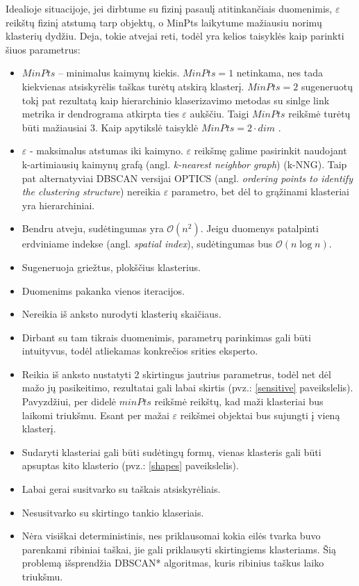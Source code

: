 \documentclass{VUMIFInfKursinis}
\newcommand{\ltang}[2]{#1 (angl. \textit{#2})}
\newcommand{\BigO}[1]{$\mathcal{O}(#1)$}
\begin{document}
Idealioje situacijoje, jei dirbtume su fizinį pasaulį atitinkančiais
duomenimis, $ε$ reikštų fizinį atstumą tarp objektų, o MinPts laikytume
mažiausiu norimų klasterių dydžiu. Deja, tokie atvejai reti, todėl yra
kelios taisyklės kaip parinkti šiuos parametrus:

\begin{itemize}
\item
  $MinPts$ – minimalus kaimynų kiekis. $MinPts = 1$
  netinkama, nes tada kiekvienas atsiskyrėlis taškas turėtų atskirą
  klasterį. $MinPts = 2$ sugeneruotų tokį pat rezultatą kaip
  hierarchinio klaserizavimo metodas su sinlge link metrika ir
  dendrograma atkirpta ties $ε$ aukščiu. Taigi $MinPts$ reikšmė
  turėtų būti mažiausiai $3$. Kaip apytikslė taisyklė $MinPts = 2 \cdot dim$
  \cite{sander1998density}.
\item
  $ε$ - maksimalus atstumas iki kaimyno. $ε$ reikšmę galime pasirinkit
  naudojant \ltang{k-artimiausių kaimynų grafą}{k-nearest neighbor graph}
  (k-NNG). Taip pat alternatyviai DBSCAN versijai \ltang{OPTICS}{ordering
  points to identify the clustering structure} nereikia $ε$
  parametro, bet dėl to grąžinami klasteriai yra hierarchiniai.
\end{itemize}

\begin{itemize}
\item
  Bendru atveju, sudėtingumas yra \BigO{n^2}. Jeigu duomenys patalpinti
  \ltang{erdviniame indekse}{spatial index}, sudėtingumas bus \BigO{n \log n}.
\item
  Sugeneruoja griežtus, plokščius klasterius.
\item
  Duomenims pakanka vienos iteracijos.
\item
  Nereikia iš anksto nurodyti klasterių skaičiaus.
\item
  Dirbant su tam tikrais duomenimis, parametrų parinkimas gali būti
  intuityvus, todėl atliekamas konkrečios srities eksperto.
\item
  Reikia iš anksto nustatyti 2 skirtingus jautrius parametrus, todėl net
  dėl mažo jų pasikeitimo, rezultatai gali labai skirtis (pvz.: \ref{sensitive} paveikslelis). Pavyzdžiui, per didelė $minPts$ reikšmė
  reikštų, kad maži klasteriai bus laikomi triukšmu. Esant per mažai $ε$
  reikšmei objektai bus sujungti į vieną klasterį.
\item
  Sudaryti klasteriai gali būti sudėtingų formų, vienas klasteris gali
  būti apsuptas kito klasterio (pvz.: \ref{shapes} paveikslelis).
\item
  Labai gerai susitvarko su taškais atsiskyrėliais.
\item
  Nesusitvarko su skirtingo tankio klaseriais.
\item
  Nėra visiškai deterministinis, nes priklausomai kokia eilės tvarka
  buvo parenkami ribiniai taškai, jie gali priklausyti skirtingiems
  klasteriams. Šią problemą išsprendžia
  DBSCAN* \cite{campello2015hierarchical}
  algoritmas, kuris ribinius taškus laiko triukšmu.
\end{itemize}
\end{document}
